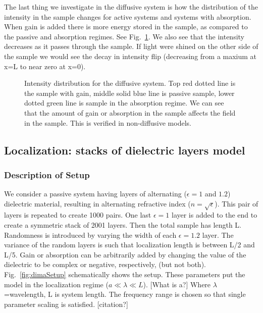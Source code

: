 The last thing we investigate in the diffusive system
is how the distribution of the intensity in the sample changes
for active systems and systems with absorption. When gain
is added there is more energy stored in the sample, as compared
to the passive and absorption regimes. See
Fig.~\ref{fig:diffusiveIntensityDistribution}. We also see that the intensity
decreases as it passes through the sample. If light were
shined on the other side of the sample we would see the decay
in intensity flip (decreasing from a maxium at x=L to near
zero at x=0).

\begin{figure}
\vskip -0.5cm
\centerline{}
\vskip -0.5cm
\caption[Intensity distribution for the diffusive system.]{Intensity distribution for the diffusive system. Top red dotted line is 
the sample with gain, middle solid blue line is passive sample, lower dotted green line
is sample in the absorption regime. We can see that the amount of gain or absorption in the sample affects the field in the sample. This is verified in non-diffusive models.}
\label{fig:diffusiveIntensityDistribution}
\end{figure}

\subsection {Localization: stacks of dielectric layers model}

\subsubsection{Description of Setup}

We consider a passive system having layers of alternating ($\epsilon = 1$ and $1.2$) dielectric material, resulting in alternating refractive index ($n = \sqrt{\epsilon}$). This pair of layers is repeated to create 1000 pairs. One last $\epsilon = 1$ layer is added to the end to create a symmetric stack of 2001 layers. Then the total sample has length L. Randomness is introduced by varying the width of each $\epsilon=1.2$ layer. The variance of the random layers is such that localization length is between L/2 and L/5. Gain or absorption can be arbitrarily added by changing the value of the dielectric to be complex or negative, respectively, (but not both). Fig.~\ref{fig:dimaSetup} schematically shows the setup. These parameters put the model in the localization regime ($a\ll\lambda\ll L$). [What is a?] Where $\lambda$=wavelength, L is system length. The frequency range is chosen so that single parameter scaling is satisfied. [citation?]


